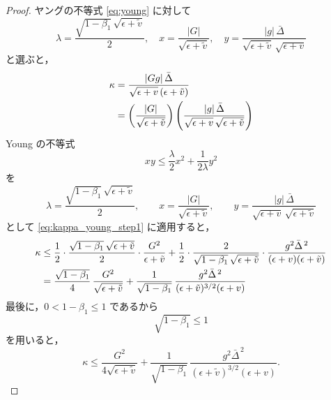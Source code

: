 \documentclass[dvipdfmx,a4paper,11pt]{jsarticle}
\begin{document}
\begin{proof}
ヤングの不等式 \eqref{eq:young} に対して
\begin{equation}
    \lambda = \frac{\sqrt{1-\beta_1}\,\sqrt{\epsilon+\tilde{v}}}{2},\quad
    x = \frac{|G|}{\sqrt{\epsilon+\tilde{v}}},\quad
    y = \frac{|g|\,\bar{\Delta}}{\sqrt{\epsilon+\tilde{v}}\,\sqrt{\epsilon+v}}
\end{equation}
と選ぶと，
\begin{align}
    \kappa
    &= \frac{|Gg|\,\bar{\Delta}}{\sqrt{\epsilon+v}\,(\epsilon+\tilde{v})} \notag\\
    &= \left(\frac{|G|}{\sqrt{\epsilon+\tilde{v}}}\right)
       \left(
         \frac{|g|\,\bar{\Delta}}
              {\sqrt{\epsilon+v}\,\sqrt{\epsilon+\tilde{v}}}
       \right)
       \label{eq:kappa_young_step1}
\end{align}
Young の不等式
\[
  xy \le \frac{\lambda}{2}x^2 + \frac{1}{2\lambda}y^2
\]
を
\[
  \lambda = \frac{\sqrt{1-\beta_1}\,\sqrt{\epsilon+\tilde{v}}}{2},\qquad
  x = \frac{|G|}{\sqrt{\epsilon+\tilde{v}}},\qquad
  y = \frac{|g|\,\bar{\Delta}}
           {\sqrt{\epsilon+v}\,\sqrt{\epsilon+\tilde{v}}}
\]
として \eqref{eq:kappa_young_step1} に適用すると，
\begin{align}
    \kappa
    &\le
    \frac{1}{2}
    \cdot
    \frac{\sqrt{1-\beta_1}\,\sqrt{\epsilon+\tilde{v}}}{2}
    \cdot
    \frac{G^2}{\epsilon+\tilde{v}}
    +
    \frac{1}{2}
    \cdot
    \frac{2}{\sqrt{1-\beta_1}\,\sqrt{\epsilon+\tilde{v}}}
    \cdot
    \frac{g^2\bar{\Delta}^{\,2}}
         {(\epsilon+v)(\epsilon+\tilde{v})}
    \notag\\
    &= \frac{\sqrt{1-\beta_1}}{4}\,
       \frac{G^2}{\sqrt{\epsilon+\tilde{v}}}
    + \frac{1}{\sqrt{1-\beta_1}}\,
      \frac{g^2\bar{\Delta}^{\,2}}
           {(\epsilon+\tilde{v})^{3/2}(\epsilon+v)}
    \label{eq:kappa_young_step2}
\end{align}
最後に，$0 < 1-\beta_1 \le 1$ であるから
\[
  \sqrt{1-\beta_1} \le 1
\]
を用いると，
\begin{equation}
    \kappa \leq \frac{G^2}{4\sqrt{\epsilon+\tilde{v}}}
    + \frac{1}{\sqrt{1-\beta_1}}\,
      \frac{g^2 \bar{\Delta}^{\,2}}{(\epsilon+\tilde{v})^{3/2}(\epsilon+v)}.
    \label{eq:kappa_bound_detail}
\end{equation}


\end{proof}
\end{document}
